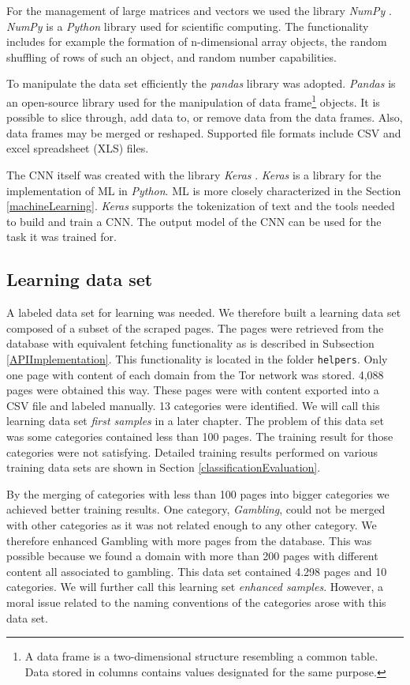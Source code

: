 For the management of large matrices and vectors we used the library \textit{NumPy} \cite{numpy}. \textit{NumPy} is a \textit{Python} library used for scientific computing. The functionality includes for example the formation of n-dimensional array objects, the random shuffling of rows of such an object, and random number capabilities. 

To manipulate the data set efficiently the \textit{pandas} library \cite{pandas} was adopted. \textit{Pandas} is an open-source library used for the manipulation of data frame\footnote{A data frame is a two-dimensional structure resembling a common table. Data stored in columns contains values designated for the same purpose. } objects. It is possible to slice through, add data to, or remove data from the data frames. Also, data frames may be merged or reshaped. Supported file formats include CSV and excel spreadsheet (XLS) files.

The CNN itself was created with the library \textit{Keras} \cite{keras}. \textit{Keras} is a library for the implementation of ML in \textit{Python}. ML is more closely characterized in the Section \ref{machineLearning}. \textit{Keras} supports the tokenization of text and the tools needed to build and train a CNN. The output model of the CNN can be used for the task it was trained for.

\subsection{Learning data set} \label{LearningDatasetImplementation}
A labeled data set for learning was needed. We therefore built a learning data set composed of a subset of the scraped pages. The pages were retrieved from the database with equivalent fetching functionality as is described in Subsection \ref{APIImplementation}. This functionality is located in the folder \texttt{helpers}. Only one page with content of each domain from the Tor network was stored. 4,088 pages were obtained this way. These pages were with content exported into a CSV file and labeled manually. 13 categories were identified. We will call this learning data set \textit{first samples} in a later chapter. The problem of this data set was some categories contained less than 100 pages. The training result for those categories were not satisfying. Detailed training results performed on various training data sets are shown in Section \ref{classificationEvaluation}. 

By the merging of categories with less than 100 pages into bigger categories we achieved better training results. One category, \textit{Gambling}, could not be merged with other categories as it was not related enough to any other category. We therefore enhanced Gambling with more pages from the database. This was possible because we found a domain with more than 200 pages with different content all associated to gambling. This data set contained 4.298 pages and 10 categories. We will further call this learning set \textit{enhanced samples}. However, a moral issue related to the naming conventions of the categories arose with this data set. 

